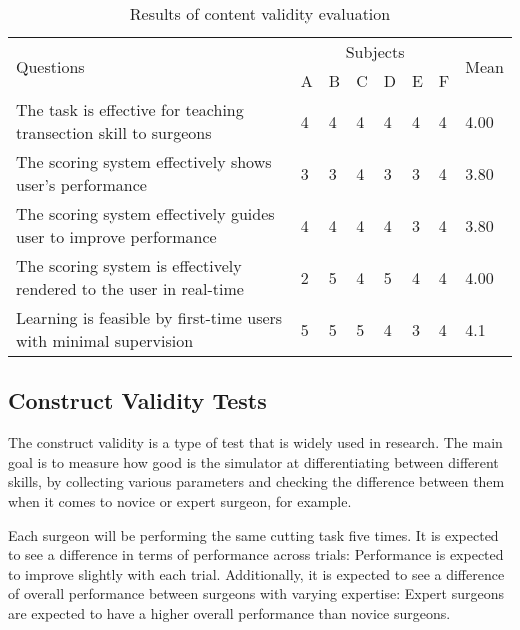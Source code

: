 \begin{table}
\small
\centering
\begin{tabular}{p{6cm}p{0.5cm}p{0.5cm}p{0.5cm}p{0.5cm}p{0.5cm}p{0.5cm}p{0.8cm}}
  \multirow{2}{4em}{Questions} & \multicolumn{6}{c}{Subjects} & \multirow{2}{4em}{Mean} \\
  \cmidrule{2-7}
  & A & B & C & D & E & F &\\
  \toprule
  The task is effective for teaching transection skill to surgeons
  & 4& 4& 4& 4 & 4& 4 & 4.00\\
  \midrule
  The scoring system effectively shows user's performance
  & 3& 3& 4 & 3 & 3 & 4 & 3.80\\
  \midrule
  The scoring system effectively guides user to improve performance
  & 4 & 4 & 4& 4& 3 & 4 & 3.80\\
  \midrule
  The scoring system is effectively rendered to the user in real-time
  & 2 & 5 & 4& 5& 4 & 4 & 4.00\\
  \midrule
  Learning is feasible by first-time users with minimal supervision & 5 & 5 & 5 & 4 & 3& 4 & 4.1\\
  \bottomrule
\end{tabular}
\caption{Results of content validity evaluation}\label{tab:contentTable2}
\end{table}

\subsection{Construct Validity Tests}\label{sec:construct}

The construct validity is a type of test that is widely used in research. The main goal is to measure how good is the simulator at differentiating between different skills, by collecting various parameters and checking the difference between them when it comes to novice or expert surgeon, for example.

Each surgeon will be performing the same cutting task five times. It is expected to see a difference in terms of performance across trials: Performance is expected to improve slightly with each trial. Additionally, it is expected to see a difference of overall performance between surgeons with varying expertise: Expert surgeons are expected to have a higher overall performance than novice surgeons.


